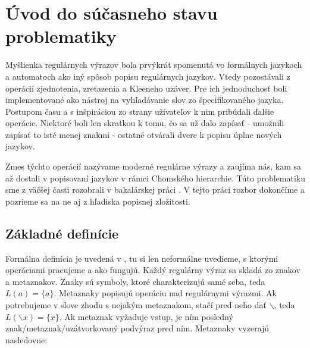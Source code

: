 \chapter[Súčasný stav problematiky]{Úvod do súčasneho stavu problematiky}
\label{chap:uvod}

Myšlienka regulárnych výrazov bola prvýkrát spomenutá vo formálnych jazykoch a automatoch ako iný spôsob popisu regulárnych jazykov. Vtedy pozostávali z operácií zjednotenia, zreťazenia a Kleeneho uzáver. Pre ich jednoduchosť boli implementované ako nástroj na vyhľadávanie slov zo špecifikovaného jazyka. Postupom času a s inšpiráciou zo strany užívateľov k nim pribúdali ďalšie operácie. Niektoré boli len skratkou k tomu, čo sa už dalo zapísať - umožnili zapísať to isté menej znakmi - ostatné otvárali dvere k popisu úplne nových jazykov.

Zmes týchto operácií nazývame moderné regulárne výrazy a zaujíma nás, kam sa až dostali v popisovaní jazykov v rámci Chomského hierarchie. Túto problematiku sme z väčšej časti rozobrali v bakalárskej práci \cite{mojaBak}. V tejto práci rozbor dokončíme a pozrieme sa na ne aj z hľadiska popisnej zložitosti.

\section{Základné definície}
\label{definicie}

Formálna definícia je uvedená v \cite{mojaBak}, tu si len neformálne uvedieme, s ktorými operáciami pracujeme a ako fungujú. Každý regulárny výraz sa skladá zo znakov a metaznakov. Znaky sú symboly, ktoré charakterizujú samé seba, teda $L(a) = \lbrace a \rbrace$. Metaznaky popisujú operáciu nad regulárnymi výrazmi. Ak potrebujeme v slove zhodu s nejakým metaznakom, stačí pred neho dať $\backslash$, teda $L(\backslash x) = \lbrace x \rbrace$. Ak metaznak vyžaduje vstup, je ním posledný znak/metaznak/uzátvorkovaný podvýraz pred ním. Metaznaky vyzerajú nasledovne:

